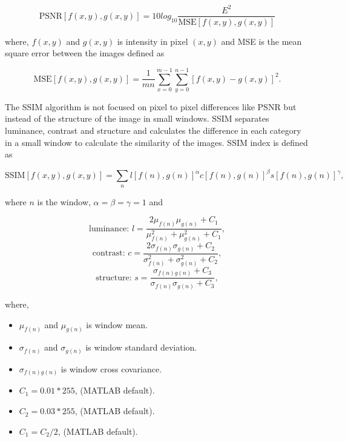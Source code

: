 \begin{equation}
    \text{PSNR}[f(x,y),g(x,y)] = 10 log_{10}\frac{E^2}{\text{MSE}[f(x,y),g(x,y)]}
\end{equation}
 
where, $f(x,y)$ and $g(x,y)$ is intensity in pixel $(x,y)$ and MSE is the mean square error between the images defined as

\begin{equation}
\text{MSE}[f(x,y),g(x,y)] = \frac{1}{mn}\sum_{x=0}^{m-1}\sum_{y=0}^{n-1}[f(x,y) - g(x,y)]^2.
\end{equation}

The SSIM algorithm is not focused on pixel to pixel differences like PSNR but instead of the structure of the image in small windows. SSIM separates  luminance, contrast and structure and calculates the difference in each category in a small window to calculate the similarity of the images. SSIM index is defined as

\begin{equation}
\text{SSIM}[f(x,y),g(x,y)] = \sum_nl[f(n),g(n)]^\alpha c[f(n),g(n)]^\beta s[f(n),g(n)]^\gamma ,
\end{equation}

where $n$ is the window, $\alpha=\beta=\gamma = 1$ and 

\begin{equation}
\displaystyle \text{luminance: } l = \frac{2\mu_{f(n)}\mu_{g(n)} + C_1}{\mu_{f(n)}^2 + \mu_{g(n)}^2 + C_1},
\end{equation}
\begin{equation}
\text{contrast: } c = \frac{2\sigma_{f(n)}\sigma_{g(n)} + C_2}{\sigma_{f(n)}^2 + \sigma_{g(n)}^2 + C_2},
\end{equation}
\begin{equation}
\text{structure: } s = \frac{\sigma_{f(n)g(n)} + C_3}{\sigma_{f(n)} \sigma_{g(n)} + C_3},
\end{equation}

where,

\begin{itemize}
\item $\mu_{f(n)}$ and $\mu_{g(n)}$ is window mean.
\item $\sigma_{f(n)}$ and $\sigma_{g(n)}$ is window standard deviation.
\item $\sigma_{f(n)g(n)}$ is window cross covariance.
\item $C_1 = 0.01*255$, (MATLAB default).
\item $C_2 = 0.03*255$, (MATLAB default).
\item $C_1 = C_2/2$, (MATLAB default).
\end{itemize} 


